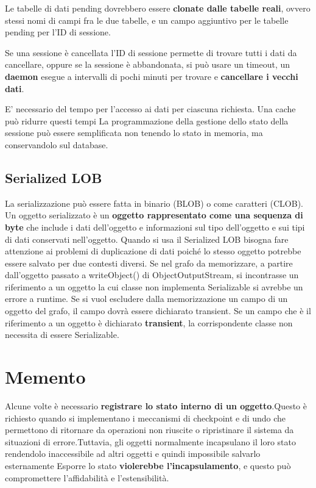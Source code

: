 Le tabelle di dati pending dovrebbero essere \textbf{clonate dalle tabelle reali}, ovvero stessi nomi di campi fra le due tabelle, e un campo aggiuntivo per le tabelle pending per l’ID di sessione. 

Se una sessione è cancellata l’ID di sessione permette di trovare tutti i
dati da cancellare, oppure se la sessione è abbandonata, si può usare un timeout, un \textbf{daemon} esegue a intervalli di pochi minuti per trovare e \textbf{cancellare i vecchi dati}.

E’ necessario del tempo per l’accesso ai dati per ciascuna
richiesta. Una cache può ridurre questi tempi La programmazione della gestione dello stato della sessione può essere semplificata non tenendo lo stato in memoria, ma conservandolo sul database.

\subsection{Serialized LOB}
La serializzazione può essere fatta in binario (BLOB) o come caratteri (CLOB). Un oggetto serializzato è un \textbf{oggetto rappresentato come una sequenza di byte} che include i dati dell’oggetto e informazioni sul tipo dell’oggetto e sui tipi di dati conservati nell’oggetto. Quando si usa il Serialized LOB bisogna fare attenzione ai problemi di duplicazione di dati poiché lo stesso oggetto potrebbe essere salvato per due contesti diversi.
Se nel grafo da memorizzare, a partire dall’oggetto passato a writeObject() di ObjectOutputStream, si incontrasse un riferimento a un oggetto la cui classe non implementa Serializable si avrebbe un errore a runtime. Se si vuol escludere dalla memorizzazione un campo di un oggetto del grafo, il campo dovrà essere dichiarato transient. Se un campo che è il riferimento a un oggetto è dichiarato \textbf{transient}, la corrispondente classe non necessita di essere Serializable.

\section{Memento}
Alcune volte è necessario \textbf{registrare lo stato interno di un oggetto}.Questo è richiesto quando si implementano i meccanismi di checkpoint e di undo che permettono di ritornare da operazioni non riuscite o ripristinare il sistema da situazioni di errore.Tuttavia, gli oggetti normalmente incapsulano il loro stato rendendolo inaccessibile ad altri oggetti e quindi impossibile salvarlo esternamente
Esporre lo stato \textbf{violerebbe l’incapsulamento}, e questo può compromettere l’affidabilità e l’estensibilità.


